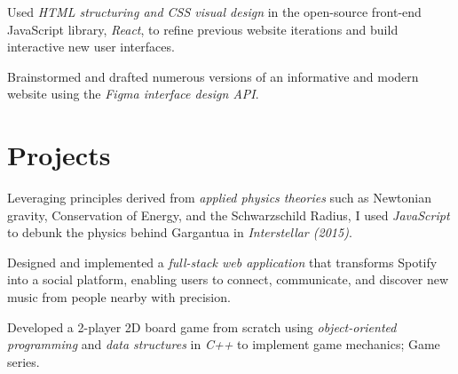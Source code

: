 \documentclass[]{aahil-resume-openfont}
\begin{document}
\begin{minipage}[t]{0.60\textwidth}
\newline
{}
\begin{tightemize}
\item Used \textit{HTML structuring and CSS visual design} in the open-source front-end JavaScript library, \textit{React}, to refine previous website iterations and build interactive new user interfaces. 
\item Brainstormed and drafted numerous versions of an informative and modern website using the \textit{Figma interface design API}.
\end{tightemize}
\sectionsep


\section{Projects}

\location{}
Leveraging principles derived from \textit{applied physics theories} such as Newtonian gravity, Conservation of Energy, and the Schwarzschild Radius, I used \textit{JavaScript} to debunk the physics behind Gargantua in \textit{Interstellar (2015)}.
\sectionsep

Designed and implemented a \textit{full-stack web application} that transforms Spotify into a social platform, enabling users to connect, communicate, and discover new music from people nearby with precision.
\sectionsep

Developed a 2-player 2D board game from scratch using \textit{object-oriented programming} and \textit{data structures} in \textit{C++} to implement game mechanics;
Game series.
\sectionsep

%
%

\end{minipage} 
\end{document}
